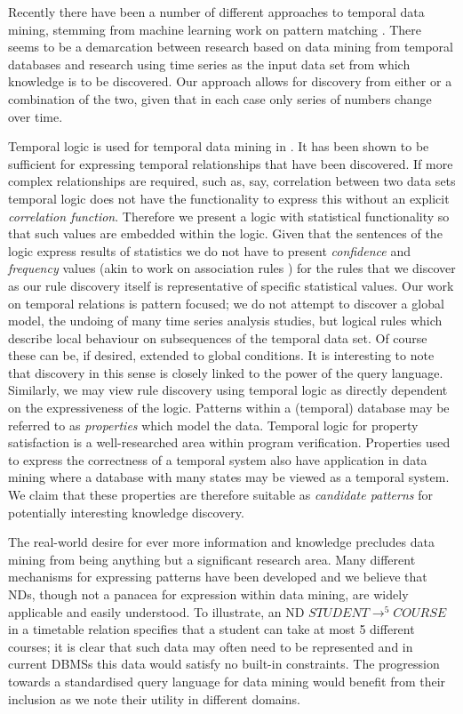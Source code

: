 \medskip

Recently there have been a number of different approaches to temporal
data mining, stemming from machine learning work on pattern
matching \cite{lai93,alss95}. There seems to be a demarcation between research based on
data mining from temporal databases and research using time series as
the input data set from which knowledge is to be discovered. Our
approach allows for discovery from either or a combination of the
two, given that in each case only series of
numbers change over time. 

\medskip

Temporal logic is used for temporal data mining in
\cite{pt96,bt98}. It has been shown to be sufficient for expressing
temporal relationships that have been discovered. If more complex
relationships are required, such as, say, correlation between two data
sets temporal logic does not have the functionality to express this
without an explicit {\em correlation function}. Therefore
we present a logic with statistical
functionality so that such values are embedded within the logic. Given
that the sentences of the logic express results of statistics
we do not have to present {\em confidence} and
{\em frequency} values (akin to work
on association rules \cite{ais93,kmrtv94,hkmt95}) for the rules that
we discover as our rule discovery 
itself is representative of specific statistical values. Our work on
temporal relations is pattern focused; we do 
not attempt to discover a global model, the undoing of many time
series analysis studies, but logical rules which describe local behaviour
on subsequences of the temporal data set. Of course these can be, if
desired, extended to global conditions.
It is interesting to note that discovery in this
sense is closely linked to the power of the query language. Similarly,
we may view rule discovery using temporal logic as directly dependent on
the expressiveness of the logic.
Patterns within a (temporal) database may be referred to as {\em properties}
which model the data. Temporal logic for property satisfaction is a
well-researched area within program verification. Properties used to
express the correctness of a temporal system also have application
in data mining where a database with many states may be viewed as a
temporal system. We claim that these properties are therefore suitable
as {\em candidate patterns} for potentially interesting knowledge
discovery. 

\medskip

The real-world desire for ever more information and knowledge
precludes data mining from being anything but a significant research
area. Many different mechanisms for expressing patterns have been
developed and we believe that NDs, though not a panacea for expression
within data mining, are widely applicable and easily understood. 
To illustrate, an ND $STUDENT \to^5 COURSE$ in a timetable relation
specifies that a student can take at most 5 different courses; it is
clear that such data may often need to be represented and in current
DBMSs this data would satisfy no built-in constraints.
The progression towards a standardised query language for data mining
\cite{cha98} 
would benefit from their inclusion as we note their utility in
different domains.


